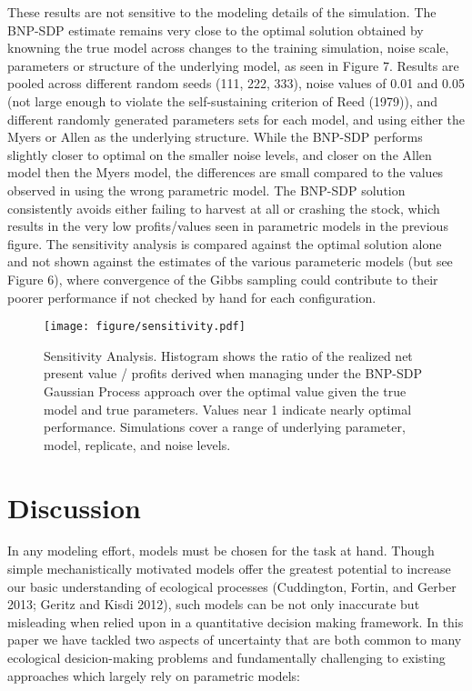 \documentclass[author-year, review]{elsarticle} %
\makeatletter
\def\maxwidth{\ifdim\Gin@nat@width>\linewidth\linewidth
\else\Gin@nat@width\fi}
\let\Oldincludegraphics\includegraphics
\renewcommand{\includegraphics}[1]{\Oldincludegraphics[width=\maxwidth]{#1}}
\makeatother
\begin{document}
These results are not sensitive to the modeling details of the
simulation. The BNP-SDP estimate remains very close to the optimal
solution obtained by knowning the true model across changes to the
training simulation, noise scale, parameters or structure of the
underlying model, as seen in Figure 7. Results are pooled across
different random seeds (111, 222, 333), noise values of 0.01 and 0.05
(not large enough to violate the self-sustaining criterion of Reed
(1979)), and different randomly generated parameters sets for each
model, and using either the Myers or Allen as the underlying structure.
While the BNP-SDP performs slightly closer to optimal on the smaller
noise levels, and closer on the Allen model then the Myers model, the
differences are small compared to the values observed in using the wrong
parametric model. The BNP-SDP solution consistently avoids either
failing to harvest at all or crashing the stock, which results in the
very low profits/values seen in parametric models in the previous
figure. The sensitivity analysis is compared against the optimal
solution alone and not shown against the estimates of the various
parameteric models (but see Figure 6), where convergence of the Gibbs
sampling could contribute to their poorer performance if not checked by
hand for each configuration.

\begin{figure}[htbp]
\centering
\texttt{[image: figure/sensitivity.pdf]}
\caption{Sensitivity Analysis. Histogram shows the ratio of the realized
net present value / profits derived when managing under the BNP-SDP
Gaussian Process approach over the optimal value given the true model
and true parameters. Values near 1 indicate nearly optimal performance.
Simulations cover a range of underlying parameter, model, replicate, and
noise levels.}
\end{figure}

\section{Discussion}\label{discussion}

In any modeling effort, models must be chosen for the task at hand.
Though simple mechanistically motivated models offer the greatest
potential to increase our basic understanding of ecological processes
(Cuddington, Fortin, and Gerber 2013; Geritz and Kisdi 2012), such
models can be not only inaccurate but misleading when relied upon in a
quantitative decision making framework. In this paper we have tackled
two aspects of uncertainty that are both common to many ecological
desicion-making problems and fundamentally challenging to existing
approaches which largely rely on parametric models:
\end{document}
